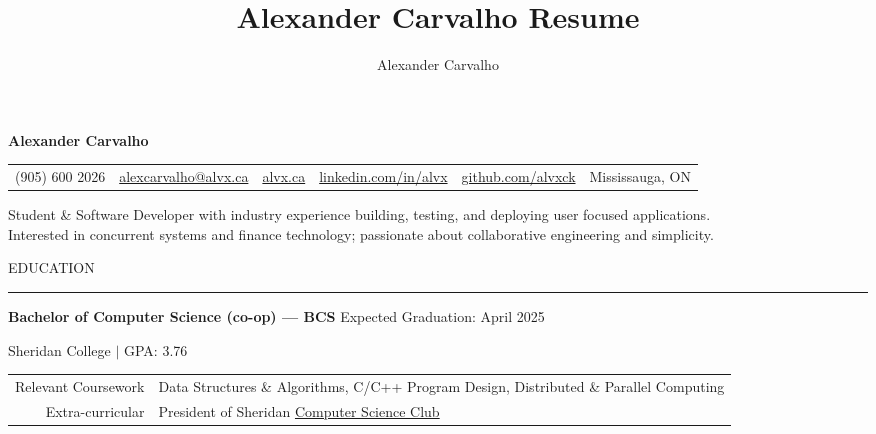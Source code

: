 \documentclass[9pt]{extarticle}
\title{Alexander Carvalho Resume}
\author{Alexander Carvalho}
\begin{document}
\color{regtextgray}


\begin{center}
	\textcolor{imptextblack}{\textbf{\Huge Alexander Carvalho}}

	\vspace{5pt}	

	\begin{tabular}{ c c c c c c }
		\textcolor{imptextblack}{(905) 600 2026} & 
		\href{mailto:alexcarvalho@alvx.ca}{alexcarvalho@alvx.ca} & 
		\href{alvx.ca}{alvx.ca} & 
		\href{https://www.linkedin.com/in/alvx}{linkedin.com/in/alvx} & 
		\href{https://www.github.com/alvxck}{github.com/alvxck} & 
		\textcolor{imptextblack}{Mississauga, ON}
	\end{tabular}

	\vspace{5pt}	

	Student \& Software Developer with industry experience building, testing, and deploying user focused applications.  \\
	Interested in concurrent systems and finance technology; passionate about collaborative engineering and simplicity.
\end{center}


\begin{adjustwidth}{4pt}{4pt} \large \textrm{EDUCATION} \end{adjustwidth}
\rule[8pt]{\linewidth}{0.4pt}

\begin{adjustwidth}{10pt}{10pt}
	\vspace{-5pt}	

	\textcolor{imptextblack}{\textbf{\large Bachelor of Computer Science (co-op) — BCS}} \hfill Expected Graduation: April 2025
	
	Sheridan College $|$ {\small GPA: 3.76}
	
	\begin{tabular}{ r l }
	 	\textcolor{imptextblack}{Relevant Coursework} & Data Structures \& Algorithms, C/C++ Program Design, Distributed \& Parallel Computing \\ 
		\textcolor{imptextblack}{Extra-curricular} & President of Sheridan \href{https://sheridancollege.campuslabs.ca/engage/organization/mobilecomputingclub}{Computer Science Club} \\
	\end{tabular}
\end{adjustwidth}
\end{document}
